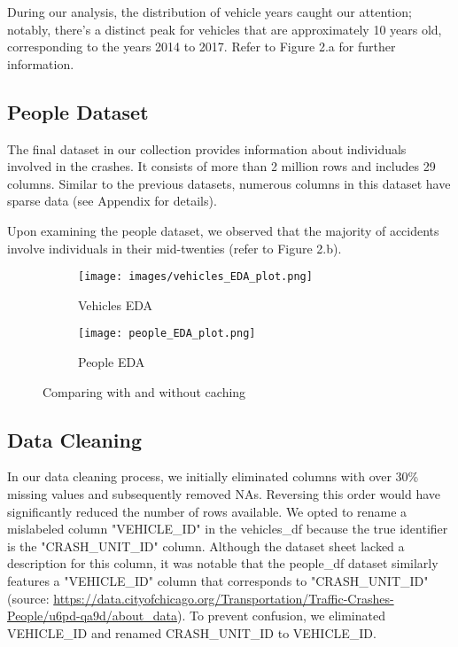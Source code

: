 \documentclass[12pt]{article}
\begin{document}
During our analysis, the distribution of vehicle years caught our attention; notably, there's a distinct peak for vehicles that are approximately 10 years old, corresponding to the years 2014 to 2017. Refer to Figure 2.a for further information.

\subsection{People Dataset}

The final dataset in our collection provides information about individuals involved in the crashes. It consists of more than 2 million rows and includes 29 columns. Similar to the previous datasets, numerous columns in this dataset have sparse data (see Appendix for details).

Upon examining the people dataset, we observed that the majority of accidents involve individuals in their mid-twenties (refer to Figure 2.b).

\begin{figure}[htbp]
  \centering
  \begin{subfigure}[b]{0.45\textwidth}
    \texttt{[image: images/vehicles\_EDA\_plot.png]}
    \caption{Vehicles EDA}
    \label{fig:fig1}
  \end{subfigure}
  \hfill
  \begin{subfigure}[b]{0.45\textwidth}
    \texttt{[image: people\_EDA\_plot.png]}
    \caption{People EDA}
    \label{fig:fig2}
  \end{subfigure}
  \caption{Comparing with and without caching}
  \label{fig:sidebyside}
\end{figure}

\subsection{Data Cleaning}

In our data cleaning process, we initially eliminated columns with over 30\% missing values and subsequently removed NAs. Reversing this order would have significantly reduced the number of rows available. We opted to rename a mislabeled column "VEHICLE\_ID" in the vehicles\_df because the true identifier is the "CRASH\_UNIT\_ID" column. Although the dataset sheet lacked a description for this column, it was notable that the people\_df dataset similarly features a "VEHICLE\_ID" column that corresponds to "CRASH\_UNIT\_ID" (source: \url{https://data.cityofchicago.org/Transportation/Traffic-Crashes-People/u6pd-qa9d/about_data}). To prevent confusion, we eliminated VEHICLE\_ID and renamed CRASH\_UNIT\_ID to VEHICLE\_ID. 
\end{document}
